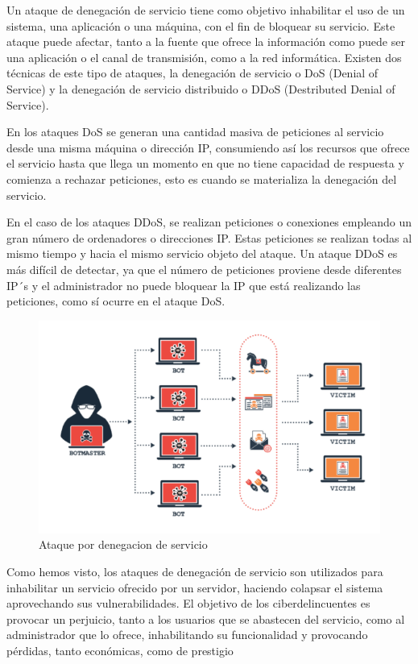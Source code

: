 Un ataque de denegación de servicio tiene como objetivo inhabilitar el uso de un sistema, una aplicación o una máquina, con el fin de bloquear su servicio. Este ataque 
puede afectar, tanto a la fuente que ofrece la información como puede ser una aplicación o el canal de transmisión, como a la red informática. Existen dos técnicas de este tipo de ataques, la denegación de servicio o DoS (Denial of Service) y la denegación de servicio distribuido o DDoS (Destributed Denial of Service).

En los ataques DoS se generan una cantidad masiva de peticiones al servicio desde una misma máquina o dirección IP, consumiendo así los recursos que ofrece el servicio hasta que llega un momento en que no tiene capacidad de respuesta y comienza a rechazar peticiones, esto es cuando se materializa la denegación del servicio.

En el caso de los ataques DDoS, se realizan peticiones o conexiones empleando un gran número de ordenadores o direcciones IP. Estas peticiones se realizan todas al mismo tiempo y hacia el mismo servicio objeto del ataque. Un ataque DDoS es más difícil de detectar, ya que el número de peticiones proviene desde diferentes IP´s y el administrador no puede bloquear la IP que está realizando las peticiones, como sí ocurre en el ataque DoS.

\begin{figure}[tphb]
  		   \centering
     		   \includegraphics[width=5in]{ddos.png}
  		   \caption{Ataque por denegacion de servicio \cite{ddos}}
  		   \label{img:ddos}
\end{figure}

Como hemos visto, los ataques de denegación de servicio son utilizados para inhabilitar un servicio ofrecido por un servidor, haciendo colapsar el sistema aprovechando sus vulnerabilidades. El objetivo de los ciberdelincuentes es provocar un perjuicio, tanto a los usuarios que se abastecen del servicio, como al administrador que lo ofrece, inhabilitando su funcionalidad y provocando pérdidas, tanto económicas, como de prestigio



